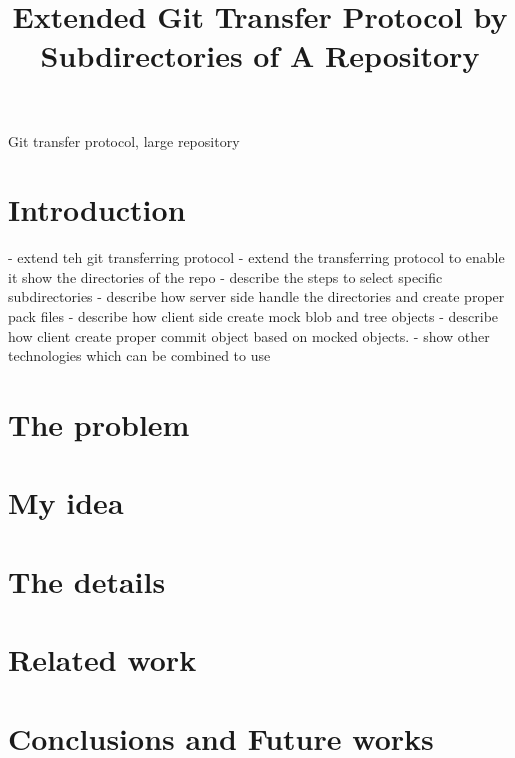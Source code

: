 \documentclass[preprint]{sigplanconf}
\begin{document}
\title{Extended Git Transfer Protocol by Subdirectories of A Repository}
\maketitle
{}

\keywords
Git transfer protocol, large repository

\section{Introduction}

- extend teh git transferring protocol
  - extend the transferring protocol to enable it show the directories of the repo
  - describe the steps to select specific subdirectories
  - describe how server side handle the directories and create proper pack files
  - describe how client side create mock blob and tree objects 
  - describe how client create proper commit object based on mocked objects.
- show other technologies which can be combined to use 

\section{The problem}


\section{My idea}

\section{The details}

\section{Related work}

\section{Conclusions and Future works}
\end{document}

